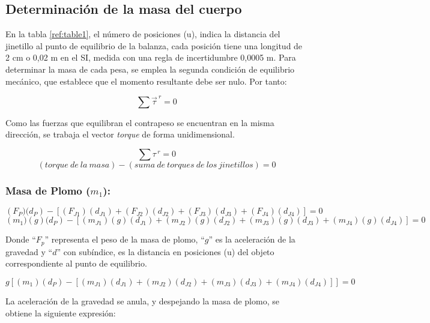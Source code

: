 \documentclass[../main.tex]{subfiles}
\begin{document}
\subsection{Determinación de la masa del cuerpo}

En la tabla \ref{ref:table1}, el número de posiciones (u), indica la distancia del jinetillo al punto de equilibrio de la balanza,
 cada posición tiene una longitud de 2 cm o 0,02 m en el SI, medida con una regla de incertidumbre 0,0005 m.
Para determinar la masa de cada pesa, se emplea la segunda condición de equilibrio mecánico, que establece que el momento 
resultante debe ser nulo. Por tanto:

\begin{equation}
    \sum \vec{\tau}^{\: r} = 0
\end{equation}

Como las fuerzas que equilibran el contrapeso se encuentran en la misma dirección, se trabaja el vector \textit{torque} 
de forma unidimensional.

\begin{equation}
    \sum \tau^{\: r} = 0
\end{equation}
\[(torque\ de\ la\ masa)-(suma\ de\ torques\ de\ los\ jinetillos)=0\]

\subsubsection*{Masa de Plomo ($m_1$):}
\[\left(F_P)(d_P\right)-\left[\left(F_{J1}\right)\left(d_{J1}\right)+\left(F_{J2}\right)\left(d_{J2}\right)+\left(F_{J3}\right)\left(d_{J3}\right)+\left(F_{J4}\right)\left(d_{J4}\right)\right]=0\]
\[\left(m_1)(g)(d_P\right)-\left[\left(m_{J1}\right)\left(g\right)\left(d_{J1}\right)+\left(m_{J2}\right)\left(g\right)\left(d_{J2}\right)+\left(m_{J3}\right)\left(g\right)\left(d_{J3}\right)+\left(m_{J4}\right)\left(g\right)\left(d_{J4}\right)\right]=0\]

Donde “$F_p$” representa el peso de la masa de plomo, “$g$” es la aceleración de la gravedad y “$d$” 
con subíndice, es la distancia en posiciones (u) del objeto correspondiente al punto de equilibrio.

\[g [ \left(m_1\right)\left(d_P\right)-\left[\left(m_{J1}\right)\left(d_{J1}\right)+\left(m_{J2}\right)\left(d_{J2}\right)+\left(m_{J3}\right)\left(d_{J3}\right)+\left(m_{J4}\right)\left(d_{J4}\right)\right]]=0\]

La aceleración de la gravedad se anula, y despejando la masa de plomo, se obtiene la siguiente expresión:
\end{document}
